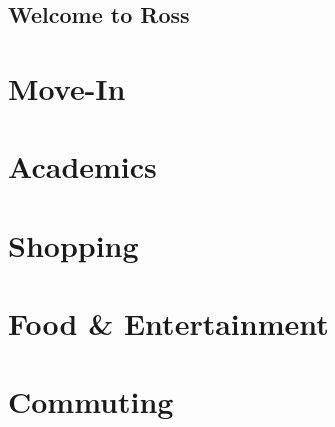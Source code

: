 \documentclass[
]{book}
\begin{document}
\hypertarget{welcome-to-ross}{%
\section{Welcome to Ross}\label{welcome-to-ross}}

\hypertarget{move-in}{%
\chapter{Move-In}\label{move-in}}

\hypertarget{academics}{%
\chapter{Academics}\label{academics}}

\hypertarget{shopping}{%
\chapter{Shopping}\label{shopping}}

\hypertarget{food-entertainment}{%
\chapter{Food \& Entertainment}\label{food-entertainment}}

\hypertarget{commuting}{%
\chapter{Commuting}\label{commuting}}

  
\end{document}
